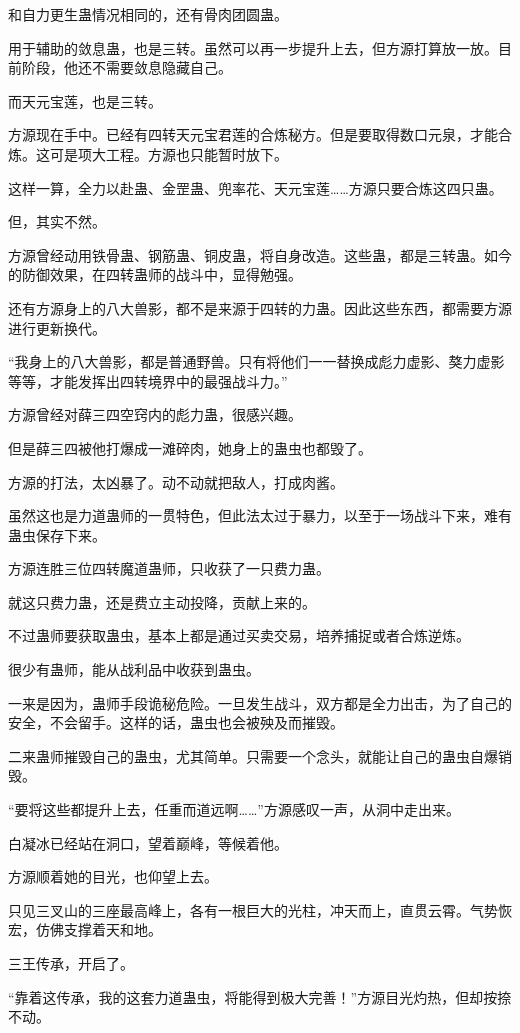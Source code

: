 \begin{this_body}
和自力更生蛊情况相同的，还有骨肉团圆蛊。

用于辅助的敛息蛊，也是三转。虽然可以再一步提升上去，但方源打算放一放。目前阶段，他还不需要敛息隐藏自己。

而天元宝莲，也是三转。

方源现在手中。已经有四转天元宝君莲的合炼秘方。但是要取得数口元泉，才能合炼。这可是项大工程。方源也只能暂时放下。

这样一算，全力以赴蛊、金罡蛊、兜率花、天元宝莲……方源只要合炼这四只蛊。

但，其实不然。

方源曾经动用铁骨蛊、钢筋蛊、铜皮蛊，将自身改造。这些蛊，都是三转蛊。如今的防御效果，在四转蛊师的战斗中，显得勉强。

还有方源身上的八大兽影，都不是来源于四转的力蛊。因此这些东西，都需要方源进行更新换代。

“我身上的八大兽影，都是普通野兽。只有将他们一一替换成彪力虚影、獒力虚影等等，才能发挥出四转境界中的最强战斗力。”

方源曾经对薛三四空窍内的彪力蛊，很感兴趣。

但是薛三四被他打爆成一滩碎肉，她身上的蛊虫也都毁了。

方源的打法，太凶暴了。动不动就把敌人，打成肉酱。

虽然这也是力道蛊师的一贯特色，但此法太过于暴力，以至于一场战斗下来，难有蛊虫保存下来。

方源连胜三位四转魔道蛊师，只收获了一只费力蛊。

就这只费力蛊，还是费立主动投降，贡献上来的。

不过蛊师要获取蛊虫，基本上都是通过买卖交易，培养捕捉或者合炼逆炼。

很少有蛊师，能从战利品中收获到蛊虫。

一来是因为，蛊师手段诡秘危险。一旦发生战斗，双方都是全力出击，为了自己的安全，不会留手。这样的话，蛊虫也会被殃及而摧毁。

二来蛊师摧毁自己的蛊虫，尤其简单。只需要一个念头，就能让自己的蛊虫自爆销毁。

“要将这些都提升上去，任重而道远啊……”方源感叹一声，从洞中走出来。

白凝冰已经站在洞口，望着巅峰，等候着他。

方源顺着她的目光，也仰望上去。

只见三叉山的三座最高峰上，各有一根巨大的光柱，冲天而上，直贯云霄。气势恢宏，仿佛支撑着天和地。

三王传承，开启了。

“靠着这传承，我的这套力道蛊虫，将能得到极大完善！”方源目光灼热，但却按捺不动。


\end{this_body}
